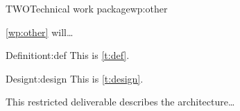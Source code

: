 
\begin{workpackage}{TWO}{Technical work package}{wp:other}

\makewptable{}

\begin{wpobjectives}
\autoref{wp:other} will\dots
\end{wpobjectives}

\begin{wpdescription}

\begin{wptask}{6}{18}{Definition}{t:def}
\makewptaskhead{}
This is \autoref{t:def}.
\end{wptask}

\begin{wptask}{12}{36}{Design}{t:design}
\makewptaskhead{}
This is \autoref{t:design}.
\end{wptask}

\end{wpdescription}

\begin{wpdeliverables}




This restricted deliverable describes the architecture\dots


\end{wpdeliverables}

\end{workpackage}
